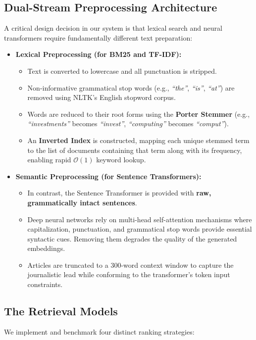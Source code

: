 \documentclass[11pt,a4paper]{article}
\begin{document}
\subsection{Dual-Stream Preprocessing Architecture}
A critical design decision in our system is that lexical search and neural transformers require fundamentally different text preparation:
\begin{itemize}[leftmargin=1.5em]
    \item \textbf{Lexical Preprocessing (for BM25 and TF-IDF):}
    \begin{itemize}
        \item Text is converted to lowercase and all punctuation is stripped.
        \item Non-informative grammatical stop words (e.g., \textit{``the''}, \textit{``is''}, \textit{``at''}) are removed using NLTK's English stopword corpus.
        \item Words are reduced to their root forms using the \textbf{Porter Stemmer} (e.g., \textit{``investments''} becomes \textit{``invest''}, \textit{``computing''} becomes \textit{``comput''}).
        \item An \textbf{Inverted Index} is constructed, mapping each unique stemmed term to the list of documents containing that term along with its frequency, enabling rapid $\mathcal{O}(1)$ keyword lookup.
    \end{itemize}
    \item \textbf{Semantic Preprocessing (for Sentence Transformers):}
    \begin{itemize}
        \item In contrast, the Sentence Transformer is provided with \textbf{raw, grammatically intact sentences}.
        \item Deep neural networks rely on multi-head self-attention mechanisms where capitalization, punctuation, and grammatical stop words provide essential syntactic cues. Removing them degrades the quality of the generated embeddings.
        \item Articles are truncated to a 300-word context window to capture the journalistic lead while conforming to the transformer's token input constraints.
    \end{itemize}
\end{itemize}

\subsection{The Retrieval Models}
We implement and benchmark four distinct ranking strategies:
\end{document}

